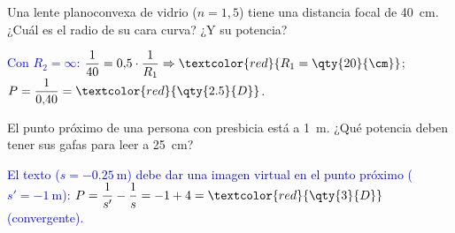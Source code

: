 \begin{exercise}
    Una lente planoconvexa de vidrio (\(n = 1{,}5\)) tiene una distancia focal de \qty{40}{\cm}. ¿Cuál es el radio de su cara
    curva? ¿Y su potencia?
    \begin{solu}
        \textcolor{blue}{Con \(R_2 = \infty\):} \(\dfrac{1}{40} = 0{,}5\cdot\dfrac{1}{R_1} \Rightarrow \textcolor{red}{R_1 = \qty{20}{\cm}}\);
        \(P = \dfrac{1}{0{,}40} = \textcolor{red}{\qty{2.5}{D}}\).
    \end{solu}
\end{exercise}

\begin{exercise}
    El punto próximo de una persona con presbicia está a \qty{1}{\m}. ¿Qué potencia deben tener sus gafas para leer a
    \qty{25}{\cm}?
    \begin{solu}
        \textcolor{blue}{El texto (\(s = \qty{-0.25}{\m}\)) debe dar una imagen virtual en el punto próximo (\(s' = \qty{-1}{\m}\)):}
        \(P = \dfrac{1}{s'} - \dfrac{1}{s} = -1 + 4 = \textcolor{red}{\qty{3}{D}}\) \textcolor{blue}{(convergente).}
    \end{solu}
\end{exercise}
